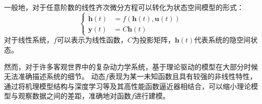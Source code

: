 一般地，对于任意阶数的线性齐次微分方程可以转化为状态空间模型的形式：
\begin{equation}
    \left\{
    \begin{aligned}
\dot {\boldsymbol h}(t)&=f(\boldsymbol h(t), \boldsymbol{u}(t))\\
\boldsymbol y(t)&= C \boldsymbol h(t)
    \end{aligned}
    \right.
\end{equation}
对于线性系统，$f$可以表示为线性函数，$C$为投影矩阵，$\boldsymbol h(t)$代表系统的隐空间状态。

然而，对于许多客观世界中的复杂动力学系统，基于理论驱动的模型在大部分时候无法准确描述系统的细节。
动态$f$表现为某一未知函数且具有较强的非线性特性，通过将机理模型结构与深度学习等及其高性能函数逼近器\cite{funahashi1993approximation}相结合，可以缩小理论模型与观察数据之间的差距，准确地对函数$f$进行建模。

